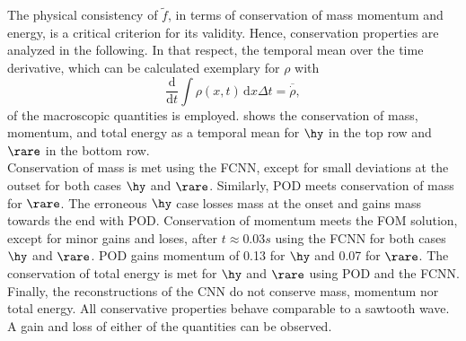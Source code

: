 The physical consistency of \(\tilde{f}\), in terms of conservation of mass momentum and energy, is a critical criterion for its validity. Hence, conservation properties are analyzed in the following. In that respect, the temporal mean over the time derivative, which can be calculated exemplary for \(\rho\) with
\begin{equation}
	\frac{\mathrm{d}}{\mathrm{d}t}\int \rho(x,t)\, \mathrm{d}x\Delta t  =\overline{\dot{\rho}}\mathrm{,}
\end{equation}
of the macroscopic quantities is employed.  shows the conservation of mass, momentum, and total energy as a temporal mean for \(\hy\) in the top row and \(\rare\) in the bottom row.\\
Conservation of mass is met using the FCNN, except for small deviations at the outset for both cases \(\hy\) and \(\rare\). Similarly, POD meets conservation of mass for \(\rare\). The erroneous \(\hy\) case losses mass at the onset and gains mass towards the end with POD. Conservation of momentum meets the FOM solution, except for minor gains and loses, after \(t\approx 0.03s\) using the FCNN for both cases \(\hy\) and \(\rare\). POD gains momentum of 0.13 for \(\hy\) and 0.07 for \(\rare\). The conservation of total energy is met for \(\hy\) and \(\rare\) using POD and the FCNN. Finally, the reconstructions of the CNN do not conserve mass, momentum nor total energy. All conservative properties behave comparable to a sawtooth wave. A gain and loss of either of the quantities can be observed.\\

